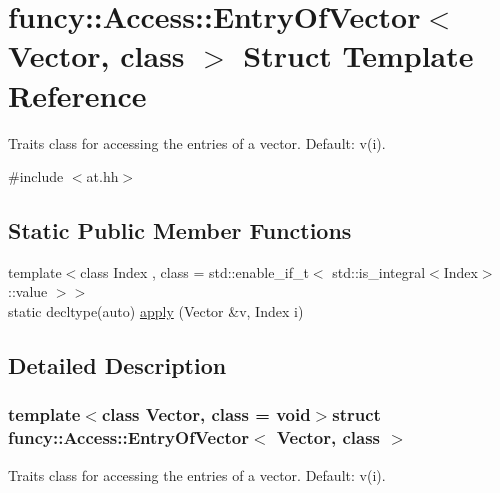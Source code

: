 \hypertarget{structfuncy_1_1Access_1_1EntryOfVector}{\section{funcy\-:\-:Access\-:\-:Entry\-Of\-Vector$<$ Vector, class $>$ Struct Template Reference}
\label{structfuncy_1_1Access_1_1EntryOfVector}
}


Traits class for accessing the entries of a vector. Default\-: v(i).  




{\ttfamily \#include $<$at.\-hh$>$}

\subsection*{Static Public Member Functions}
\begin{DoxyCompactItemize}
\item 
{\footnotesize template$<$class Index , class  = std\-::enable\-\_\-if\-\_\-t$<$ std\-::is\-\_\-integral$<$\-Index$>$\-::value $>$$>$ }\\static decltype(auto) \hyperlink{structfuncy_1_1Access_1_1EntryOfVector_a78930662cd7c7baae9f1fa5332f5c7d0}{apply} (Vector \&v, Index i)
\end{DoxyCompactItemize}


\subsection{Detailed Description}
\subsubsection*{template$<$class Vector, class = void$>$struct funcy\-::\-Access\-::\-Entry\-Of\-Vector$<$ Vector, class $>$}

Traits class for accessing the entries of a vector. Default\-: v(i). 

